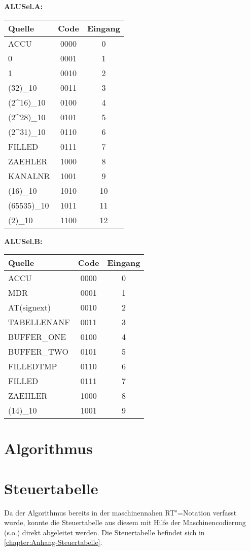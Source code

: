 \textbf{ALUSel.A:}

\begin{tabular}{lcc}
    Quelle               & Code & Eingang \\
    \hline
    ACCU                 & 0000 &  0 \\
    0                    & 0001 &  1 \\
    1                    & 0010 &  2 \\
    (32)_{10}            & 0011 &  3 \\
    (2^{16})_{10}        & 0100 &  4 \\
    (2^{28})_{10}        & 0101 &  5 \\
    (2^{31})_{10}        & 0110 &  6 \\
    FILLED               & 0111 &  7 \\
    ZAEHLER              & 1000 &  8 \\
    KANALNR              & 1001 &  9 \\
    (16)_{10}            & 1010 & 10 \\
    (65535)_{10}         & 1011 & 11 \\
    (2)_{10}             & 1100 & 12 \\
\end{tabular}

\textbf{ALUSel.B:}

\begin{tabular}{lcc}
    Quelle       & Code & Eingang \\
    \hline
    ACCU          & 0000 &  0 \\
    MDR           & 0001 &  1 \\
    AT(signext)   & 0010 &  2 \\
    TABELLENANF   & 0011 &  3 \\
    BUFFER\_ONE   & 0100 &  4 \\
    BUFFER\_TWO   & 0101 &  5 \\
    FILLEDTMP     & 0110 &  6 \\
    FILLED        & 0111 &  7 \\
    ZAEHLER       & 1000 &  8 \\
    (14)_{10}     & 1001 &  9 \\
\end{tabular}

\section{Algorithmus}
\label{section:Dokumentation-Implementierung-Algorithmus}


\section{Steuertabelle}
\label{section:Dokumentation-Implementierung-Steuertabelle}

Da der Algorithmus bereits in der maschinennahen RT"=Notation verfasst wurde, konnte die Steuertabelle aus diesem mit Hilfe der Maschinencodierung (s.o.) direkt abgeleitet werden. Die Steuertabelle befindet sich in \autoref{chapter:Anhang-Steuertabelle}.
